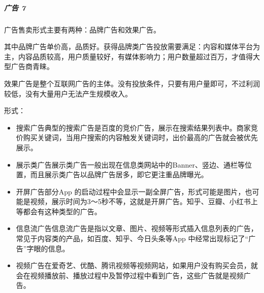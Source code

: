 \documentclass[letterpaper,11pt,english]{sphinxmanual}
\begin{document}
\subparagraph{广告 7\sphinxfootnotemark[112]}
\label{\detokenize{chapter_introduction/money:id10}}%
\begin{footnotetext}[112]\sphinxAtStartFootnote
{}
%
\end{footnotetext}\ignorespaces 
广告售卖形式主要有两种：品牌广告和效果广告。

其中品牌广告单价高，品质好。获得品牌类广告投放需要满足：内容和媒体平台为主，内容品质较高，用户质量较好，有媒体影响力；用户数量超过百万，才值得大型广告商青睐。

效果广告是整个互联网广告的主体。没有投放条件，只要有用户量即可，不过利润较低，没有大量用户无法产生规模收入。%
\begin{footnote}[113]\sphinxAtStartFootnote
{}
%
\end{footnote}

形式：
\begin{itemize}
\item {} 
搜索广告典型的搜索广告是百度的竞价广告，展示在搜索结果列表中。商家竞价购买关键词，当用户搜索的内容触发关键词时，出价最高的广告就会被优先展示。

\item {} 
展示类广告展示类广告一般出现在信息类网站中的Banner、竖边、通栏等位置，而且展示类广告以品牌广告居多，即它更注重品牌曝光。

\item {} 
开屏广告部分App
的启动过程中会显示一副全屏广告，形式可能是图片，也可能是视频，展示时间为3～5秒不等，这就是开屏广告。知乎、豆瓣、小红书上等都会有这种类型的广告。

\item {} 
信息流广告信息流广告是指以文章、图片、视频等形式插入信息列表的广告，常见于内容类的产品，如百度、知乎、今日头条等App
中经常出现标记了“广告”字眼的信息。

\item {} 
视频广告在爱奇艺、优酷、腾讯视频等视频网站，如果用户没有购买会员，就会在视频播放前、播放过程中及暂停过程中看到广告，这些广告就是视频广告。

\end{itemize}
\end{document}
